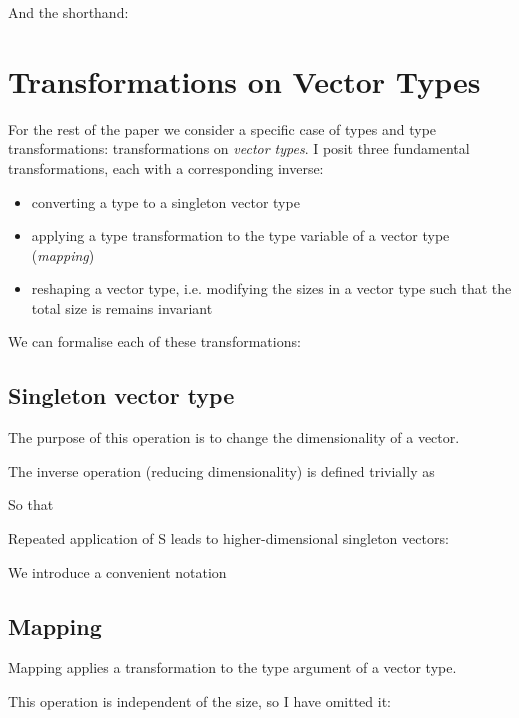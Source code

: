 \documentclass{article}
\begin{document}
\emph{}

And the shorthand:

\emph{}


\section{Transformations on Vector Types }

For the rest of the paper we consider a specific case of types and
type transformations: transformations on \emph{vector types}. I posit
three fundamental transformations, each with a corresponding inverse:
\begin{itemize}
\item converting a type to a singleton vector type
\item applying a type transformation to the type variable of a vector type
(\emph{mapping})
\item reshaping a vector type, i.e. modifying the sizes in a vector type
such that the total size is remains invariant
\end{itemize}
We can formalise each of these transformations:


\subsection{Singleton vector type }

The purpose of this operation is to change the dimensionality of a
vector. 



The inverse operation (reducing dimensionality) is defined trivially
as



So that





Repeated application of S leads to higher-dimensional singleton vectors:



We introduce a convenient notation




\subsection{Mapping}

Mapping applies a transformation to the type argument of a vector
type.

This operation is independent of the size, so I have omitted it:
\end{document}
